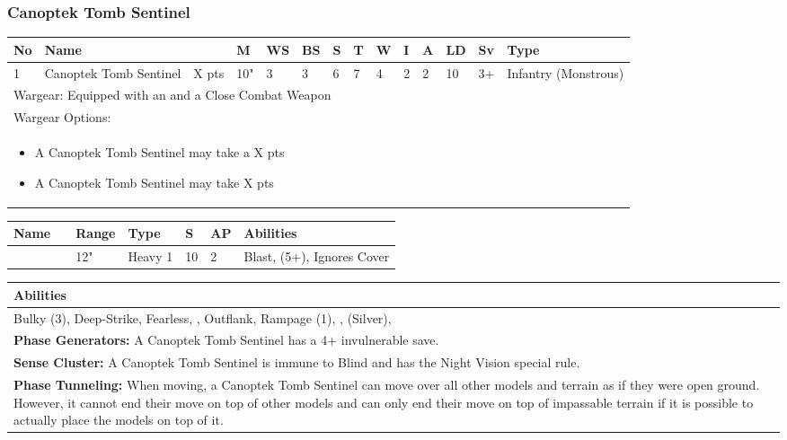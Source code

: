 \newpage
\subsubsection{Canoptek Tomb Sentinel}

\noindent
\begin{tabular}{||m{10pt} m{115pt} m{30pt} m{11pt} m{11pt} m{11pt} m{11pt} m{11pt} m{11pt} m{11pt} m{11pt} m{11pt} m{11pt} m{105pt}||}
	\hline
	No & Name & & M & WS & BS & S & T & W & I & A & LD & Sv & Type \\
	\hline
	1 & Canoptek Tomb Sentinel & X pts & 10" & 3 & 3 & 6 & 7 & 4 & 2 & 2 & 10 & 3+ & Infantry (Monstrous)\\
	\hline
	\hline
	\multicolumn{14}{||Z{532 pt}||}{Wargear: Equipped with an \quickref{Exile Cannon} and a Close Combat Weapon}\\
	\multicolumn{14}{||Z{532 pt}||}{Wargear Options:} \\	\multicolumn{14}{||Z{532 pt}||}{\begin{itemize}
			\item A Canoptek Tomb Sentinel may take a \quickref{Gloom Prism} \hrulefill X pts
			\item A Canoptek Tomb Sentinel may take \quickref{Sepulchral Scarabs} \hrulefill X pts
	\end{itemize}} \\
	\hline
\end{tabular}

\noindent
\begin{tabular}{||m{110pt} m{30pt} m{31pt} m{55pt} m{12pt} m{12pt} m{210pt}||}
	\hline
	Name & & Range & Type & S & AP & Abilities \\
	\hline
	\quickref{Exile Cannon} & & 12" & Heavy 1 & 10 & 2 & Blast, \quickref{Exile Ray} (5+), Ignores Cover \\
	\hline
\end{tabular}

\noindent
\begin{tabular}{||m{532pt}||}
	\hline
	Abilities \\
	\hline
	Bulky (3), Deep-Strike, Fearless, \quickref{Living Metal}, Outflank, Rampage (1), \quickref{Reanimation Protocols}, \quickref{Soulless Hordes} (Silver), \quickref{Tomb Guardians} \\
	\textbf{Phase Generators:} A Canoptek Tomb Sentinel has a 4+ invulnerable save. \\
	\textbf{Sense Cluster:} A Canoptek Tomb Sentinel is immune to Blind and has the Night Vision special rule. \\
	\textbf{Phase Tunneling:} When moving, a Canoptek Tomb Sentinel can move over all other models and terrain as if they were open ground. However, it cannot end their move on top of other models and can only end their move on top of impassable terrain if it is possible to actually place the models on top of it. \\
	\hline
\end{tabular}



